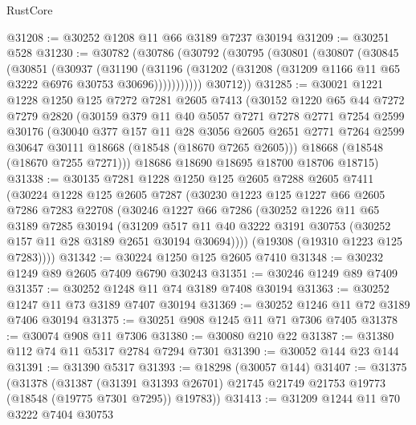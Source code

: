 \begin{lexlean}{RustCore}
\begin{coremodule}
@31208 := @30252 @1208 @11 @66 @3189 @7237 @30194
@31209 := @30251 @528
@31230 := @30782
    (@30786
      (@30792
        (@30795
          (@30801
            (@30807
              (@30845
                (@30851
                  (@30937
                    (@31190
                      (@31196
                        (@31202 (@31208 (@31209 @1166 @11 @65 @3222 @6976 @30753 @30696)))))))))))
        @30712))
@31285 := @30021
    @1221
    @1228
    @1250
    @125
    @7272
    @7281
    @2605
    @7413
    (@30152
      @1220
      @65
      @44
      @7272
      @7279
      @2820
      (@30159
        @379
        @11
        @40
        @5057
        @7271
        @7278
        @2771
        @7254
        @2599
        @30176
        (@30040
          @377
          @157
          @11
          @28
          @3056
          @2605
          @2651
          @2771
          @7264
          @2599
          @30647
          @30111
          @18668
          (@18548 (@18670 @7265 @2605)))
        @18668
        (@18548 (@18670 @7255 @7271)))
      @18686
      @18690
      @18695
      @18700
      @18706
      @18715)
@31338 := @30135
    @7281
    @1228
    @1250
    @125
    @2605
    @7288
    @2605
    @7411
    (@30224
      @1228
      @125
      @2605
      @7287
      (@30230
        @1223
        @125
        @1227
        @66
        @2605
        @7286
        @7283
        @22708
        (@30246
          @1227
          @66
          @7286
          (@30252
            @1226
            @11
            @65
            @3189
            @7285
            @30194
            (@31209
              @517
              @11
              @40
              @3222
              @3191
              @30753
              (@30252 @157 @11 @28 @3189 @2651 @30194 @30694))))
        (@19308 (@19310 @1223 @125 @7283))))
@31342 := @30224 @1250 @125 @2605 @7410
@31348 := @30232 @1249 @89 @2605 @7409 @6790 @30243
@31351 := @30246 @1249 @89 @7409
@31357 := @30252 @1248 @11 @74 @3189 @7408 @30194
@31363 := @30252 @1247 @11 @73 @3189 @7407 @30194
@31369 := @30252 @1246 @11 @72 @3189 @7406 @30194
@31375 := @30251 @908 @1245 @11 @71 @7306 @7405
@31378 := @30074 @908 @11 @7306
@31380 := @30080 @210 @22
@31387 := @31380 @112 @74 @11 @5317 @2784 @7294 @7301
@31390 := @30052 @144 @23 @144
@31391 := @31390 @5317
@31393 := @18298 (@30057 @144)
@31407 := @31375
    (@31378
      (@31387
        (@31391 @31393 @26701)
        @21745
        @21749
        @21753
        @19773
        (@18548 (@19775 @7301 @7295))
        @19783))
@31413 := @31209 @1244 @11 @70 @3222 @7404 @30753

\end{coremodule}
\end{lexlean}
